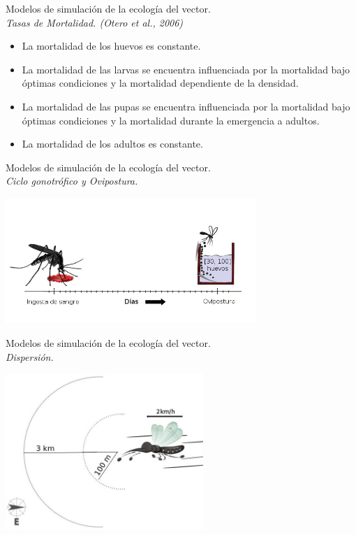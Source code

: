 \begin{frame}[c]{Modelos de simulación de la ecología del vector.\\\textit{Tasas de Mortalidad. (Otero et al., 2006)}}

  \begin{itemize}
      \item La mortalidad de los huevos es constante.
      \item La mortalidad de las larvas se encuentra influenciada por la mortalidad bajo óptimas condiciones y la mortalidad dependiente de la densidad.
      \item La mortalidad de las pupas se encuentra influenciada por la mortalidad bajo óptimas condiciones y la mortalidad durante la emergencia a adultos.
      \item La mortalidad de los adultos es constante.
  \end{itemize}
\end{frame}


\begin{frame}[c]{Modelos de simulación de la ecología del vector.\\\textit{Ciclo gonotrófico y Ovipostura.}}
  \begin{center}
      \includegraphics[width=9.5cm]{./graphics/cliclo-gonotrofico-tiempo.jpg}
  \end{center}
\end{frame}

\begin{frame}[t]{Modelos de simulación de la ecología del vector.\\\textit{Dispersión.}}
  \begin{center}
    \includegraphics[width=7.5cm]{./graphics/dispersion.jpg}
  \end{center}
\end{frame}

